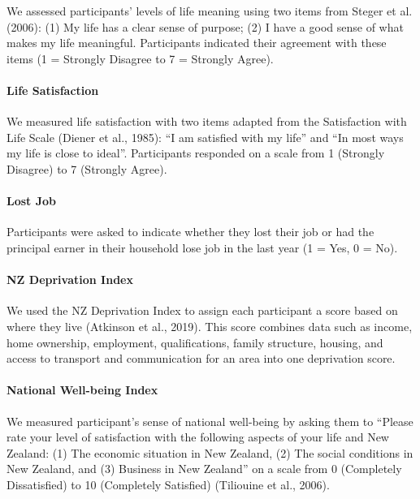 \documentclass[
  letterpaper,
  DIV=11,
  numbers=noendperiod]{scrartcl}
\let\oldparagraph\paragraph
\renewcommand{\paragraph}[1]{\oldparagraph{#1}\mbox{}}
\begin{document}
We assessed participants' levels of life meaning using two items from
Steger et al. (2006): (1) My life has a clear sense of purpose; (2) I
have a good sense of what makes my life meaningful. Participants
indicated their agreement with these items (1 = Strongly Disagree to 7 =
Strongly Agree).

\hypertarget{life-satisfaction}{%
\paragraph{Life Satisfaction}\label{life-satisfaction}}

We measured life satisfaction with two items adapted from the
Satisfaction with Life Scale (Diener et al., 1985): ``I am satisfied
with my life'' and ``In most ways my life is close to ideal''.
Participants responded on a scale from 1 (Strongly Disagree) to 7
(Strongly Agree).

\hypertarget{lost-job}{%
\paragraph{Lost Job}\label{lost-job}}

Participants were asked to indicate whether they lost their job or had
the principal earner in their household lose job in the last year (1 =
Yes, 0 = No).

\hypertarget{nz-deprivation-index}{%
\paragraph{NZ Deprivation Index}\label{nz-deprivation-index}}

We used the NZ Deprivation Index to assign each participant a score
based on where they live (Atkinson et al., 2019). This score combines
data such as income, home ownership, employment, qualifications, family
structure, housing, and access to transport and communication for an
area into one deprivation score.

\hypertarget{national-well-being-index}{%
\paragraph{National Well-being Index}\label{national-well-being-index}}

We measured participant's sense of national well-being by asking them to
``Please rate your level of satisfaction with the following aspects of
your life and New Zealand: (1) The economic situation in New Zealand,
(2) The social conditions in New Zealand, and (3) Business in New
Zealand'' on a scale from 0 (Completely Dissatisfied) to 10 (Completely
Satisfied) (Tiliouine et al., 2006).
\end{document}

